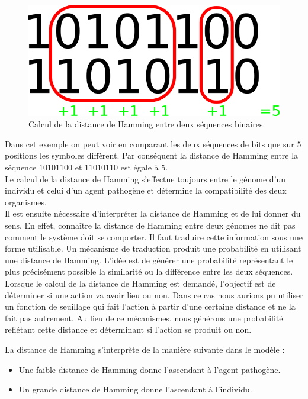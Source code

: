 \begin{figure}[h]
	\centering
	\captionsetup{justification=centering}
	\includegraphics[scale=1]{Images/hamming.png}
	\caption[Calcul de la distance de Hamming]{Calcul de la distance de Hamming entre deux séquences binaires.}
\end{figure}

Dans cet exemple on peut voir en comparant les deux séquences de bits que sur $5$ positions les symboles diffèrent. Par conséquent la distance de Hamming entre la séquence $10101100$ et $11010110$ est égale à $5$.\\

Le calcul de la distance de Hamming s'effectue toujours entre le génome d'un individu et celui d'un agent pathogène et détermine la compatibilité des deux organismes.\\

Il est ensuite nécessaire d'interpréter la distance de Hamming et de lui donner du sens. En effet, connaître la distance de Hamming entre deux génomes ne dit pas comment le système doit se comporter. Il faut traduire cette information sous une forme utilisable. Un mécanisme de traduction produit une probabilité en utilisant une distance de Hamming. L'idée est de générer une probabilité représentant le plus précisément possible la similarité ou la différence entre les deux séquences. Lorsque le calcul de la distance de Hamming est demandé, l'objectif est de déterminer si une action va avoir lieu ou non. Dans ce cas nous aurions pu utiliser un fonction de seuillage qui fait l'action à partir d'une certaine distance et ne la fait pas autrement. Au lieu de ce mécanismes, nous générons une probabilité reflétant cette distance et déterminant si l'action se produit ou non.

La distance de Hamming s’interprète de la manière suivante dans le modèle :\\

\begin{itemize}
	\item Une faible distance de Hamming donne l'ascendant à l'agent pathogène.
	\item Un grande distance de Hamming donne l'ascendant à l'individu.
\end{itemize}

